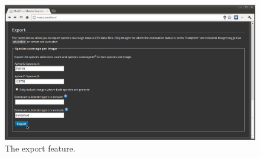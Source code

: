 \documentclass[twoside,a4paper]{refart}
\begin{document}
\begin{figure}[hbtp]
\centering
\includegraphics[width=\textwidth]{screenshots/masis-export}
\caption{The export feature.}
\label{fig:masis-export}
\end{figure}

\printindex
\end{document}
